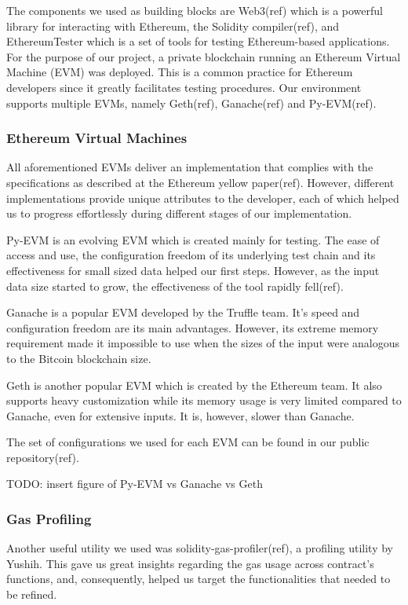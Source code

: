 \documentclass{article}
\begin{document}
  The components we used as building blocks are Web3(ref) which is a
  powerful library for interacting with Ethereum, the Solidity
  compiler(ref), and EthereumTester which is a set of tools for testing
  Ethereum-based applications. For the purpose of our project, a private
  blockchain running an Ethereum Virtual Machine (EVM) was deployed.
  This is a common practice for Ethereum developers since it greatly
  facilitates testing procedures. Our environment supports multiple
  EVMs, namely Geth(ref), Ganache(ref) and Py-EVM(ref).

  \subsubsection{Ethereum Virtual Machines}

  All aforementioned EVMs deliver an implementation that complies with
  the specifications as described at the Ethereum yellow paper(ref).
  However, different implementations provide unique attributes to the
  developer, each of which helped us to progress effortlessly during
  different stages of our implementation.

  Py-EVM is an evolving EVM which is created mainly for testing. The
  ease of access and use, the configuration freedom of its underlying
  test chain and its effectiveness for small sized data helped our first
  steps. However, as the input data size started to grow, the
  effectiveness of the tool rapidly fell(ref).

  Ganache is a popular EVM developed by the Truffle team. It’s speed and
  configuration freedom are its main advantages. However, its extreme
  memory requirement made it impossible to use when the sizes of the
  input were analogous to the Bitcoin blockchain size.

  Geth is another popular EVM which is created by the Ethereum team. It
  also supports heavy customization while its memory usage is very
  limited compared to Ganache, even for extensive inputs. It is,
  however, slower than Ganache.

  The set of configurations we used for each EVM can be found in our
  public repository(ref).

  TODO: insert figure of Py-EVM vs Ganache vs Geth

  \subsubsection{Gas Profiling}

  Another useful utility we used was solidity-gas-profiler(ref), a
  profiling utility by Yushih. This gave us great insights regarding the
  gas usage across contract’s functions, and, consequently, helped us
  target the functionalities that needed to be refined.
\end{document}
